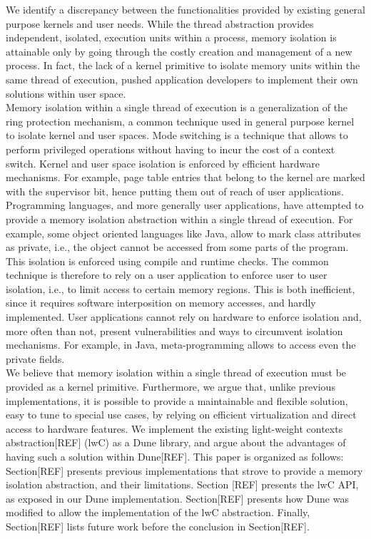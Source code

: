 \documentclass[letterpaper,twocolumn,10pt]{article}
\begin{document}
We identify a discrepancy between the functionalities provided by existing general purpose kernels and user needs.
While the thread abstraction provides independent, isolated, execution units within a process, memory isolation is attainable only by going through the costly creation and management of a new process.
In fact, the lack of a kernel primitive to isolate memory units within the same thread of execution, pushed application developers to implement their own solutions within user space. \\

Memory isolation within a single thread of execution is a generalization of the ring protection mechanism, a common technique used in general purpose kernel to isolate kernel and user spaces.
Mode switching is a technique that allows to perform privileged operations without having to incur the cost of a context switch.
Kernel and user space isolation is enforced by efficient hardware mechanisms.
For example, page table entries that belong to the kernel are marked with the supervisor bit, hence putting them out of reach of user applications. \\

Programming languages, and more generally user applications, have attempted to provide a memory isolation abstraction within a single thread of execution.
For example, some object oriented languages like Java, allow to mark class attributes as private, i.e., the object cannot be accessed from some parts of the program.
This isolation is enforced using compile and runtime checks.
The common technique is therefore to rely on a user application to enforce user to user isolation, i.e., to limit access to certain memory regions.
This is both inefficient, since it requires software interposition on memory accesses, and hardly implemented.
User applications cannot rely on hardware to enforce isolation and, more often than not, present vulnerabilities and ways to circumvent isolation mechanisms.
For example, in Java, meta-programming allows to access even the private fields.\\

We believe that memory isolation within a single thread of execution must be provided as a kernel primitive.
Furthermore, we argue that, unlike previous implementations, it is possible to provide a maintainable and flexible solution, easy to tune to special use cases, by relying on efficient virtualization and direct access to hardware features.
We implement the existing light-weight contexts abstraction[REF] (lwC) as a Dune library, and argue about the advantages of having such a solution within Dune[REF].
This paper is organized as follows: Section[REF] presents previous implementations that strove to provide a memory isolation abstraction, and their limitations.
Section [REF] presents the lwC API, as exposed in our Dune implementation.
Section[REF] presents how Dune was modified to allow the implementation of the lwC abstraction.
Finally, Section[REF] lists future work before the conclusion in Section[REF].
\end{document}
